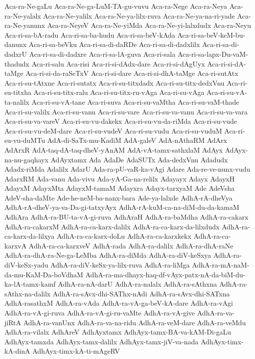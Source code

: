{Aca-ra-Ne-gaLu
Aca-ra-Ne-ga-LuM-TA-gu-vuvu
Aca-ra-Nege
Aca-ra-Neya
Aca-ra-Ne-yalalx
Aca-ra-Ne-yalilx
Aca-ra-Ne-ya-lilx-ruva
Aca-ra-Ne-ya-na-ri-yade
Aca-ra-Ne-yanunx
Aca-ra-NeyeV
Aca-ra-Ne-yiMda
Aca-ra-Ne-yi-lalxdudx
Aca-ra-Neyu
Aca-ri-sa-bA-radu
Aca-ri-sa-ba-hudu
Aca-ri-sa-beV-kAda
Aca-ri-sa-beV-keM-bu-danunx
Aca-ri-sa-beVku
Aca-ri-sa-di-daRDe
Aca-ri-sa-di-dadxlilx
Aca-ri-sa-di-dadxrU
Aca-ri-sa-di-dadxre
Aca-ri-sa-lA-guva
Aca-ri-sala
Aca-ri-sa-lapx-Du-vaM-thadudx
Aca-ri-salu
Aca-risi
Aca-ri-si-dAdx-dare
Aca-ri-si-dAgUyx
Aca-ri-si-dA-taMge
Aca-ri-si-da-raSeTxV
Aca-ri-si-dare
Aca-ri-si-dhA-taMge
Aca-ri-sutAtx
Aca-ri-su-tAtxne
Aca-ri-sutatx
Aca-ri-su-titxdadx
Aca-ri-su-titx-dedxVnu
Aca-ri-su-titxha
Aca-ri-su-titx-ralu
Aca-ri-su-titx-ru-vAga
Aca-ri-su-vAga
Aca-ri-su-vA-ta-nalilx
Aca-ri-su-vA-tane
Aca-ri-suva
Aca-ri-su-vaMtha
Aca-ri-su-vaM-thade
Aca-ri-su-valilx
Aca-ri-su-vanu
Aca-ri-su-vare
Aca-ri-su-va-vanu
Aca-ri-su-va-vara
Aca-ri-su-va-vareV
Aca-ri-su-vu-dakekx
Aca-ri-su-vu-da-riMda
Aca-ri-su-vude
Aca-ri-su-vu-deM-dare
Aca-ri-su-vudeV
Aca-ri-su-vudu
Aca-ri-su-vuduM
Aca-ri-su-vu-duMTu
AdA-di-SaTx-mu-KadiM
AdA-galeV
AdA-nAthaRM
AdArx
AdArxR
AdA-taq-dA-taq-dheV-yAnAM
AdA-vA-tamx-sathxlaM
AdAyx
AdAyx-na-nu-gaqhayx
AdAyxtamx
Ada
AdaDe
AdaSUTx
Ada-dedxVnu
Adadudx
Adadx-riMda
Adalilx
AdarU
Ada-ra-pU-vaR-ka-vAgi
Adare
Ada-re-ve-nunx-vudu
AdarxRM
Ada-vanu
Ada-vivu
Ada-yA-Ga-na-relilx
Adayayx
Adayx
AdayxH
AdayxM
AdayxMta
AdayxM-tamaM
Adayxra
Adayx-tarxyaM
Ade
AdeVsha
AdeV-sha-daMte
Ade-he-neM-ba-nanx-bara
Ade-ya-lalxde
AdhA-rA-dheVya
AdhA-rA-dheV-ya-va-Da-gi-tatxyAyx
AdhA-rA-kuM-ca-na-diM-du-da-kamaM
AdhAra
AdhA-ra-BU-ta-vA-gi-ruva
AdhAraH
AdhA-ra-baMdha
AdhA-ra-cakarx
AdhA-ra-cakarxM
AdhA-ra-ca-karx-dalilx
AdhA-ra-ca-karx-da-lilxdudx
AdhA-ra-ca-karx-da-lilxya
AdhA-ra-ca-karx-doLu
AdhA-ra-ca-karxkekx
AdhA-ra-ca-karxvA
AdhA-ra-ca-karxveV
AdhA-rada
AdhA-ra-dalilx
AdhA-ra-dhA-raNe
AdhA-ra-dhA-ra-Ne-ga-LeMba
AdhA-ra-diMda
AdhA-ra-diV-keSxya
AdhA-ra-diV-keSx-yadu
AdhA-ra-diV-keSx-ya-lilx-ruva
AdhA-ra-liMga
AdhA-ra-mA-naM-da-mu-KaM-Da-boVdhaM
AdhA-ra-ma-dhayx-haq-df-vAyx-patx-nA-da-biM-du-ka-lA-tamx-kamf
AdhA-ra-nA-darU
AdhA-ra-nalalx
AdhA-ra-sAthxna
AdhA-ra-sAthx-na-dalilx
AdhA-ra-sAvx-dhi-SAThx-nAdi
AdhA-ra-sAvx-dhi-SATxna
AdhA-rasathxM
AdhA-ra-vAda
AdhA-ra-vA-ga-beV-kA-dare
AdhA-ra-vAgi
AdhA-ra-vA-gi-ruva
AdhA-ra-vA-gi-ru-vaMte
AdhA-ra-vA-give
AdhA-ra-va-jiRtA
AdhA-ra-vanUnx
AdhA-ra-va-na-ridu
AdhA-ra-veM-dare
AdhA-ra-veMdu
AdhA-ra-vilalx
AdhAreV
AdhAyxtamx
AdhAyx-tamx-BA-va-kAM-Di-gaLu
AdhAyx-tamxda
AdhAyx-tamx-dalilx
AdhAyx-tamx-jiV-va-nada
AdhAyx-timx-kA-dinA
AdhAyx-timx-kA-ti-mAgeRV
}

